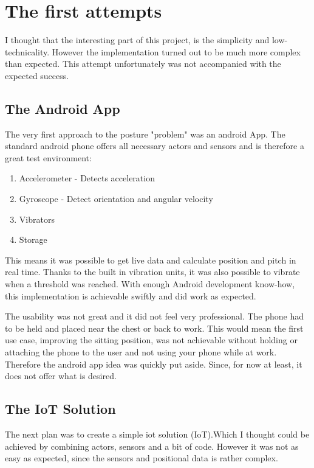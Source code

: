 \chapter*{The first attempts}
\label{chap:The first attempts}
\renewcommand{\thesection}{\arabic{section}}
\setcounter{section}{0}

I thought that the interesting part of this project, is the simplicity and low-technicality. However the implementation turned out to be much more complex than expected. This attempt unfortunately was not accompanied with the expected success.

\section{The Android App}

The very first approach to the posture "problem" was an android App. The standard android phone offers all necessary actors and sensors and is therefore a great test environment: 
\begin{enumerate}
    \item \gls{Accelerometer} - Detects acceleration
    \item \gls{Gyroscope} - Detect orientation and angular velocity \cite{Gyroscop33:online}
    \item Vibrators
    \item Storage
\end{enumerate}

This means it was possible to get live data and calculate position and pitch in real time. Thanks to the built in vibration units, it was also possible to vibrate when a threshold was reached. With enough Android development know-how, this implementation is achievable swiftly and did work as expected.

The usability was not great and it did not feel very professional. The phone had to be held and placed near the chest or back to work. This would mean the first use case, improving the sitting position, was not achievable without holding or attaching the phone to the user and not using your phone while at work. Therefore the android app idea was quickly put aside. Since, for now at least, it does not offer what is desired.

\newpage
\section{The IoT Solution}

The next plan was to create a simple \acrshort{iot} solution (\gls{IoT}).Which I thought could be achieved by combining actors, sensors and a bit of code. However it was not as easy as expected, since the sensors and positional data is rather complex. 

